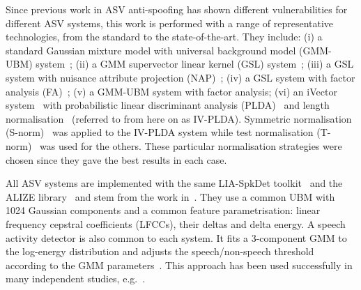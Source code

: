 
Since previous work in ASV anti-spoofing has shown different vulnerabilities for different ASV systems, this work is performed with a range of representative technologies, from the standard to the state-of-the-art.
They include: 
(i) a standard Gaussian mixture model with universal background model (GMM-UBM) system~\cite{Reynolds2000};
(ii) a GMM supervector linear kernel (GSL) system~\cite{Campbell2006b};
(iii) a GSL system with nuisance attribute projection (NAP)~\cite{Campbell2006};
(iv) a GSL system with factor analysis (FA)~\cite{Fauve2007};
(v) a GMM-UBM system with factor analysis;
(vi) an iVector system~\cite{Dehak2011} with probabilistic linear discriminant analysis (PLDA)~\cite{Li2012} and length normalisation~\cite{Garcia2011} (referred to from here on as IV-PLDA). 
Symmetric normalisation (S-norm)~\cite{Kenny2010} was applied to the IV-PLDA system while test normalisation (T-norm)~\cite{Auckenthaler2000} was used for the others.  These particular normalisation strategies were chosen since they gave the best results in each case. 

All ASV systems are implemented with the same LIA-SpkDet toolkit~\cite{Bonastre2008} and the ALIZE library~\cite{Bonastre2004} and stem from the work in~\cite{Fauve2007}.
They use a common UBM with 1024 Gaussian components and a common feature parametrisation: linear frequency cepstral coefficients (LFCCs), their deltas and delta energy. 
A speech activity detector is also common to each system.  
It fits a 3-component GMM to the log-energy distribution and adjusts the speech/non-speech threshold according to the GMM parameters~\cite{Bimbot2004}.
This approach has been used successfully in many independent studies, e.g.~\cite{fauve2008}. 
